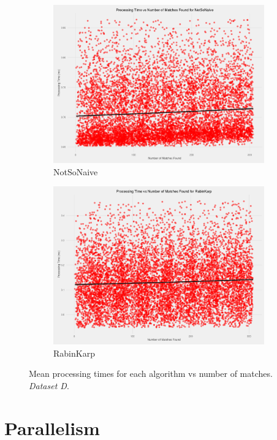 \documentclass[11pt]{article}
\begin{document}
\begin{figure}[!htb]
\begin{subfigure}[b]{0.48\textwidth}
      \includegraphics[width=\textwidth]{images/processing_speed_vs_num_matches_NotSoNaive}
      \caption{NotSoNaive}
  \end{subfigure}
  \begin{subfigure}[b]{0.48\textwidth}
      \includegraphics[width=\textwidth]{images/processing_speed_vs_num_matches_RabinKarp}
      \caption{RabinKarp}
  \end{subfigure}
  \caption{Mean processing times for each algorithm vs number of matches. \textit{Dataset D}.}
  \label{figure-individualalgorithmsvsnumberofmatches}
\end{figure}


\section{Parallelism}
\end{document}
